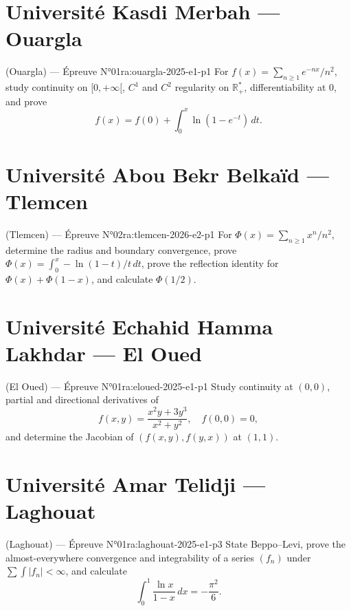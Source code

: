 \section{Université Kasdi Merbah --- Ouargla}
\begin{problem}{(Ouargla) — Épreuve N°01}{ra:ouargla-2025-e1-p1}
For $f(x)=\sum_{n\ge1}e^{-nx}/n^2$, study continuity on $[0,+\infty[$, $C^1$ and $C^2$ regularity on $\mathbb R_+^*$, differentiability at $0$, and prove
$$f(x)=f(0)+\int_0^x\ln(1-e^{-t})\,dt.$$
\end{problem}
\newpage
\section{Université Abou Bekr Belkaïd --- Tlemcen}
\begin{problem}{(Tlemcen) — Épreuve N°02}{ra:tlemcen-2026-e2-p1}
For $\Phi(x)=\sum_{n\ge1}x^n/n^2$, determine the radius and boundary convergence, prove $\Phi(x)=\int_0^x-\ln(1-t)/t\,dt$, prove the reflection identity for $\Phi(x)+\Phi(1-x)$, and calculate $\Phi(1/2)$.
\end{problem}
\newpage
\section{Université Echahid Hamma Lakhdar --- El Oued}
\begin{problem}{(El Oued) — Épreuve N°01}{ra:eloued-2025-e1-p1}
Study continuity at $(0,0)$, partial and directional derivatives of
$$f(x,y)=\frac{x^2y+3y^3}{x^2+y^2},\quad f(0,0)=0,$$
and determine the Jacobian of $(f(x,y),f(y,x))$ at $(1,1)$.
\end{problem}
\newpage
\section{Université Amar Telidji --- Laghouat}
\begin{problem}{(Laghouat) — Épreuve N°01}{ra:laghouat-2025-e1-p3}
State Beppo--Levi, prove the almost-everywhere convergence and integrability of a series $(f_n)$ under $\sum\int|f_n|<\infty$, and calculate
$$\int_0^1\frac{\ln x}{1-x}\,dx=-\frac{\pi^2}{6}.$$
\end{problem}
\newpage
